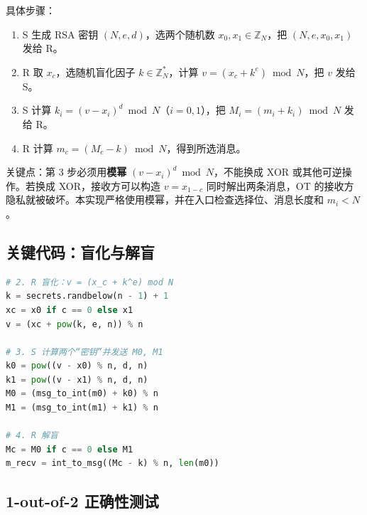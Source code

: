 \documentclass{SYSUReport}
\begin{document}
\begin{center}
\end{center}

具体步骤：

\begin{enumerate}
  \item S 生成 RSA 密钥 $(N,e,d)$，选两个随机数 $x_0,x_1\in\mathbb{Z}_N$，把 $(N,e,x_0,x_1)$ 发给 R。
  \item R 取 $x_c$，选随机盲化因子 $k\in\mathbb{Z}_N^*$，计算 $v=(x_c+k^e)\bmod N$，把 $v$ 发给 S。
  \item S 计算 $k_i=(v-x_i)^d\bmod N$（$i=0,1$），把 $M_i=(m_i+k_i)\bmod N$ 发给 R。
  \item R 计算 $m_c=(M_c-k)\bmod N$，得到所选消息。
\end{enumerate}

关键点：第 3 步必须用\textbf{模幂} $(v-x_i)^d\bmod N$，不能换成 XOR 或其他可逆操作。若换成 XOR，接收方可以构造 $v=x_{1-c}$ 同时解出两条消息，OT 的接收方隐私就被破坏。本实现严格使用模幂，并在入口检查选择位、消息长度和 $m_i<N$。

\subsection{关键代码：盲化与解盲}

\begin{lstlisting}[language=Python, caption={RSA 盲化 OT 核心片段}]
# 2. R 盲化：v = (x_c + k^e) mod N
k = secrets.randbelow(n - 1) + 1
xc = x0 if c == 0 else x1
v = (xc + pow(k, e, n)) % n

# 3. S 计算两个“密钥”并发送 M0, M1
k0 = pow((v - x0) % n, d, n)
k1 = pow((v - x1) % n, d, n)
M0 = (msg_to_int(m0) + k0) % n
M1 = (msg_to_int(m1) + k1) % n

# 4. R 解盲
Mc = M0 if c == 0 else M1
m_recv = int_to_msg((Mc - k) % n, len(m0))
\end{lstlisting}

\subsection{1-out-of-2 正确性测试}
\end{document}
